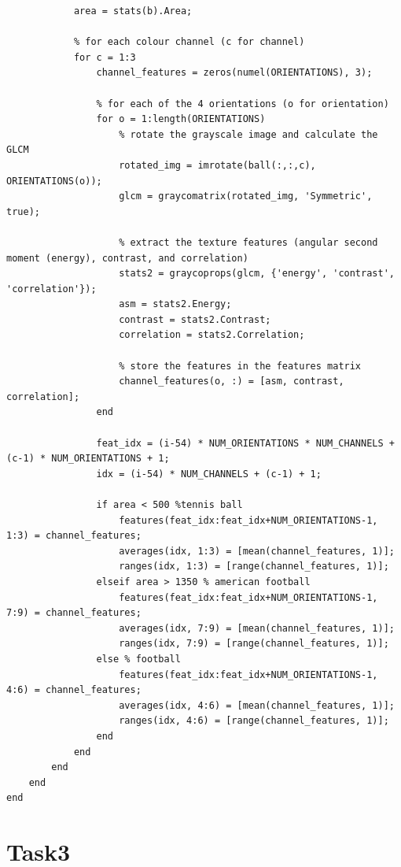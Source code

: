 \documentclass[conference]{IEEEtran}
\begin{document}
\begin{lstlisting}[style=Matlab-editor, basicstyle=\scriptsize]
            % get the area for identifying the ball type
            area = stats(b).Area;

            % for each colour channel (c for channel)
            for c = 1:3
                channel_features = zeros(numel(ORIENTATIONS), 3); 

                % for each of the 4 orientations (o for orientation)
                for o = 1:length(ORIENTATIONS) 
                    % rotate the grayscale image and calculate the GLCM
                    rotated_img = imrotate(ball(:,:,c), ORIENTATIONS(o));
                    glcm = graycomatrix(rotated_img, 'Symmetric', true);
                    
                    % extract the texture features (angular second moment (energy), contrast, and correlation)
                    stats2 = graycoprops(glcm, {'energy', 'contrast', 'correlation'});
                    asm = stats2.Energy;
                    contrast = stats2.Contrast;
                    correlation = stats2.Correlation;
                    
                    % store the features in the features matrix
                    channel_features(o, :) = [asm, contrast, correlation]; 
                end
                
                feat_idx = (i-54) * NUM_ORIENTATIONS * NUM_CHANNELS + (c-1) * NUM_ORIENTATIONS + 1;
                idx = (i-54) * NUM_CHANNELS + (c-1) + 1;

                if area < 500 %tennis ball
                    features(feat_idx:feat_idx+NUM_ORIENTATIONS-1, 1:3) = channel_features; 
                    averages(idx, 1:3) = [mean(channel_features, 1)];
                    ranges(idx, 1:3) = [range(channel_features, 1)];
                elseif area > 1350 % american football
                    features(feat_idx:feat_idx+NUM_ORIENTATIONS-1, 7:9) = channel_features; 
                    averages(idx, 7:9) = [mean(channel_features, 1)];
                    ranges(idx, 7:9) = [range(channel_features, 1)];
                else % football
                    features(feat_idx:feat_idx+NUM_ORIENTATIONS-1, 4:6) = channel_features; 
                    averages(idx, 4:6) = [mean(channel_features, 1)];
                    ranges(idx, 4:6) = [range(channel_features, 1)];
                end
            end
        end
    end
end
            \end{lstlisting}
    \section{Task3}
\end{document}
